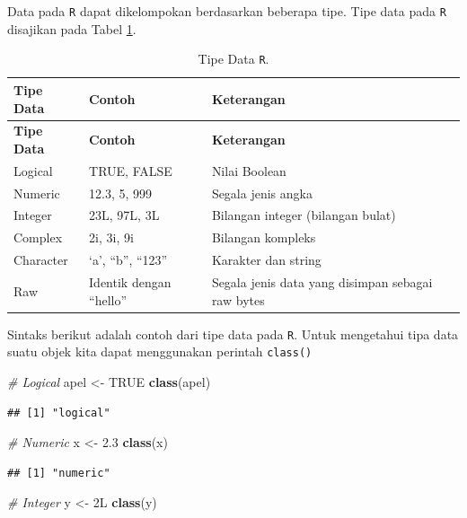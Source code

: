 \documentclass[]{book}
\newenvironment{Shaded}{\begin{snugshade}}{\end{snugshade}}
\newcommand{\KeywordTok}[1]{\textcolor[rgb]{0.13,0.29,0.53}{\textbf{#1}}}
\newcommand{\FloatTok}[1]{\textcolor[rgb]{0.00,0.00,0.81}{#1}}
\newcommand{\StringTok}[1]{\textcolor[rgb]{0.31,0.60,0.02}{#1}}
\newcommand{\CommentTok}[1]{\textcolor[rgb]{0.56,0.35,0.01}{\textit{#1}}}
\newcommand{\OtherTok}[1]{\textcolor[rgb]{0.56,0.35,0.01}{#1}}
\newcommand{\NormalTok}[1]{#1}
\begin{document}
Data pada \texttt{R} dapat dikelompokan berdasarkan beberapa tipe. Tipe
data pada \texttt{R} disajikan pada Tabel \ref{tab:tipedata}.

\begin{longtable}[]{@{}lll@{}}
\caption{\label{tab:tipedata} Tipe Data \texttt{R}.}\tabularnewline
\toprule
\textbf{Tipe Data} & \textbf{Contoh} &
\textbf{Keterangan}\tabularnewline
\midrule
\endfirsthead
\toprule
\textbf{Tipe Data} & \textbf{Contoh} &
\textbf{Keterangan}\tabularnewline
\midrule
\endhead
Logical & TRUE, FALSE & Nilai Boolean\tabularnewline
Numeric & 12.3, 5, 999 & Segala jenis angka\tabularnewline
Integer & 23L, 97L, 3L & Bilangan integer (bilangan
bulat)\tabularnewline
Complex & 2i, 3i, 9i & Bilangan kompleks\tabularnewline
Character & `a', ``b'', ``123'' & Karakter dan string\tabularnewline
Raw & Identik dengan ``hello'' & Segala jenis data yang disimpan sebagai
raw bytes\tabularnewline
\bottomrule
\end{longtable}

Sintaks berikut adalah contoh dari tipe data pada \texttt{R}. Untuk
mengetahui tipa data suatu objek kita dapat menggunakan perintah
\texttt{class()}

\begin{Shaded}
\begin{Highlighting}[]
\CommentTok{# Logical}
\NormalTok{apel <-}\StringTok{ }\OtherTok{TRUE}
\KeywordTok{class}\NormalTok{(apel)}
\end{Highlighting}
\end{Shaded}

\begin{verbatim}
## [1] "logical"
\end{verbatim}

\begin{Shaded}
\begin{Highlighting}[]
\CommentTok{# Numeric}
\NormalTok{x <-}\StringTok{ }\FloatTok{2.3}
\KeywordTok{class}\NormalTok{(x)}
\end{Highlighting}
\end{Shaded}

\begin{verbatim}
## [1] "numeric"
\end{verbatim}

\begin{Shaded}
\begin{Highlighting}[]
\CommentTok{# Integer}
\NormalTok{y <-}\StringTok{ }\NormalTok{2L}
\KeywordTok{class}\NormalTok{(y)}
\end{Highlighting}
\end{Shaded}
\end{document}
